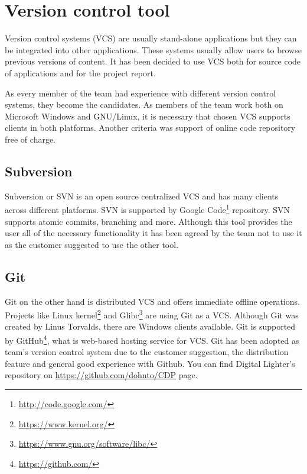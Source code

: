 
\section{Version control tool}
\label{sec:vcs}
Version control systems (VCS) are usually stand-alone applications but they can be integrated into other applications. These systems usually allow users to browse previous versions of content. It has been decided to use VCS both for source code of applications and for the project report. 

As every member of the team had experience with different version control systems, they become the candidates. As members of the team work both on Microsoft Windows and GNU/Linux, it is necessary that chosen VCS supports clients in both platforms. Another criteria was support of online code repository free of charge.


\subsection{Subversion}
Subversion or SVN is an open source centralized VCS and has many clients across different platforms. 
SVN is supported by Google Code\footnote{\url{http://code.google.com/}} repository.
SVN supports atomic commits, branching and more. Although this tool provides the user all of the necessary functionality it has been agreed by the team not to use it as the customer suggested to use the other tool.


\subsection{Git}
\label{subsec:git}
Git on the other hand is distributed VCS and offers immediate offline operations.
Projects like Linux kernel\footnote{\url{https://www.kernel.org/}} and Glibc\footnote{\url{https://www.gnu.org/software/libc/}} are using Git as a VCS.
Although Git was created by Linus Torvalds, there are Windows clients available.
Git is supported by GitHub\footnote{\url{https://github.com/}}, what is web-based hosting service for VCS. Git has been adopted as team's version control system due to the customer suggestion, the distribution feature and general good experience with Github.
You can find Digital Lighter's repository on \url{https://github.com/dohnto/CDP} page.

